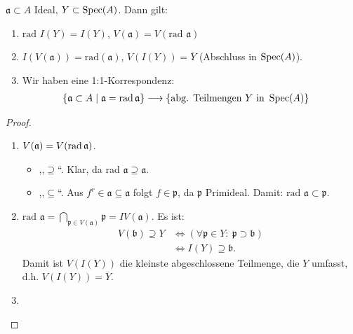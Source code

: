 \begin{prop} $\mathfrak{a}\subset A$ Ideal,
  $Y\subset\operatorname{Spec}(A)$. Dann gilt:
  \begin{enumerate}
  \item $\text{rad }I(Y)=I(Y)$, $V(\mathfrak{a})=V(\text{rad
    }\mathfrak{a})$
  \item $I(V(\mathfrak{a}))=\text{rad}(\mathfrak{a})$,
    $V(I(Y))=\overline{Y}$ (Abschluss in $\operatorname{Spec}(A)$).
  \item Wir haben eine 1:1-Korrespondenz:
    \begin{align*}
      \{\mathfrak{a}\subset A\mid\mathfrak{a}=\operatorname{rad}\mathfrak{a}\}
      & \longrightarrow\{\text{abg. Teilmengen }Y\text{ in }\operatorname{Spec}(A)\}
    \end{align*}
  \end{enumerate}
\end{prop}
\begin{proof} \mbox{}
  \begin{enumerate}
  \item $V(\mathfrak{a})=V(\operatorname{rad}\mathfrak{a})$.
    \begin{itemize}
    \item ,,$\supseteq$``. Klar, da rad
      $\mathfrak{a}\supseteq\mathfrak{a}$.
    \item ,,$\subseteq$``. Aus $f^{r}\in\mathfrak{a}\subseteq\mathfrak{a}$
      folgt $f\in\mathfrak{p}$, da $\mathfrak{p}$ Primideal. Damit:
      $\text{rad }\mathfrak{a}\subset\mathfrak{p}.$
    \end{itemize}
  \item $\text{rad }\mathfrak{a}=\bigcap_{\mathfrak{p}\in
      V(\mathfrak{a})}\mathfrak{p}=IV(\mathfrak{a})$.  Es ist:
    \begin{align*}
      V(\mathfrak{b})\supseteq Y & \Leftrightarrow(\forall\mathfrak{p}\in Y:\
                                   \mathfrak{p}\supset\mathfrak{b})\\
                                 & \Leftrightarrow
                                   I(Y)\supseteq\mathfrak{b}.
    \end{align*} Damit ist $V(I(Y))$ die kleinste abgeschlossene
    Teilmenge, die $Y$ umfasst, d.h. $V(I(Y))=\overline{Y}$.
  \item
  \end{enumerate}
\end{proof}
